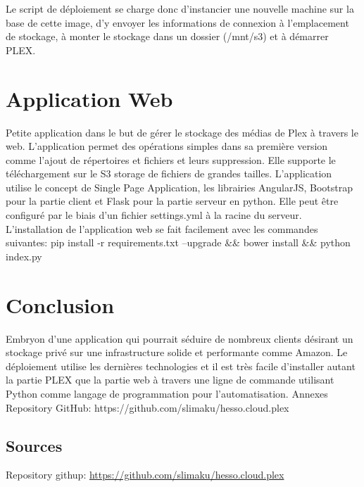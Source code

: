 \documentclass[french]{msereport}
\begin{document}
		Le script de déploiement se charge donc d’instancier une nouvelle machine sur la base de cette image, d’y envoyer les informations de connexion à l’emplacement de stockage, à monter le stockage dans un dossier (/mnt/s3) et à démarrer PLEX.
	
	\section{Application Web}
		Petite application dans le but de gérer le stockage des médias de Plex à travers le web. L’application permet des opérations simples dans sa première version comme l’ajout de répertoires et fichiers et leurs suppression. Elle supporte le téléchargement sur le S3 storage de fichiers de grandes tailles.
		L’application utilise le concept de Single Page Application, les librairies AngularJS, Bootstrap pour la partie client et Flask pour la partie serveur en python.
		Elle peut être configuré par le biais d’un fichier settings.yml à la racine du serveur. L’installation de l’application web se fait facilement avec les commandes suivantes:
		pip install -r requirements.txt --upgrade \&\& bower install \&\& python index.py
	
	\section{Conclusion}
		Embryon d’une application qui pourrait séduire de nombreux clients désirant un stockage privé sur une infrastructure solide et performante comme Amazon.
		Le déploiement utilise les dernières technologies et il est très facile d’installer autant la partie PLEX que la partie web à travers une ligne de commande utilisant Python comme langage de programmation pour l’automatisation.
		Annexes
		Repository GitHub: https://github.com/slimaku/hesso.cloud.plex
	
	
	\appendixsection
		\subsection{Sources}
			Repository githup: \url{https://github.com/slimaku/hesso.cloud.plex}
		
\end{document}
